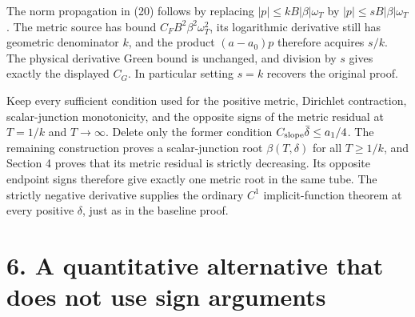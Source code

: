 \documentclass[11pt]{article}
\begin{document}
The norm propagation in (20) follows by replacing \(|p|\leq kB|\beta|\omega_T\)
by \(|p|\leq sB|\beta|\omega_T\). The metric source has bound
\(C_FB^2\beta^2\omega_T^2\), its logarithmic derivative still has geometric
denominator \(k\), and the product \((a-a_0)p\) therefore acquires \(s/k\).
The physical derivative Green bound is unchanged, and division by \(s\)
gives exactly the displayed \(C_G\). In particular setting \(s=k\) recovers
the original proof.

Keep every sufficient condition used for the positive metric, Dirichlet
contraction, scalar-junction monotonicity, and the opposite signs of the metric
residual at \(T=1/k\) and \(T\to\infty\). Delete only the former condition
\(C_{\rm slope}\bar\delta\leq a_1/4\). The remaining construction proves a
scalar-junction root \(\beta(T,\delta)\) for all \(T\geq1/k\), and Section 4
proves that its metric residual is strictly decreasing. Its opposite endpoint
signs therefore give exactly one metric root in the same tube. The strictly
negative derivative supplies the ordinary \(C^1\) implicit-function theorem
at every positive \(\delta\), just as in the baseline proof.

\section{6. A quantitative alternative that does not use sign arguments}\label{a-quantitative-alternative-that-does-not-use-sign-arguments}
\end{document}
